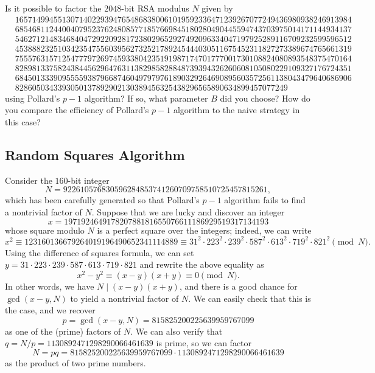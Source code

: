 \begin{exercise}
    Is it possible to factor the $2048$-bit RSA modulus $N$ given by 
    \begin{align*}
        & 1657149945513071402293947654868380061019592336471239267077249436980938246913984 \\
        & 6854681124400407952376248085771857669845180280490445594743703975014171144934137 \\
        & 5462712148346840472922092817238029652927492096334047197925289116709232599596512 \\
        & 4538882325103423547556039562732521789245444030511675452311827273389674765661319 \\ 
        & 7555763157125477797269745933804235191987174701777001730108824080893548375470164 \\ 
        & 8289813375824384456296476311382985828848739394326260608105080229109327176724351 \\ 
        & 6845013339095555938796687460497979761890329264690895603572561138043479640686906 \\ 
        & 8286050343393050137892902130389456325438296565890634899457077249
    \end{align*}
    using Pollard's $p-1$ algorithm? If so, what parameter $B$ did you choose? 
    How do you compare the efficiency of Pollard's $p-1$ algorithm to the 
    naive strategy in this case?
\end{exercise}

\subsection{Random Squares Algorithm}
Consider the $160$-bit integer 
\[ N = 922610576830596284853741260709758510725457815261, \] 
which has been carefully generated so that Pollard's $p-1$ algorithm fails to 
find a nontrivial factor of $N$. Suppose that we are lucky and discover an 
integer 
\[ x = 197192464917820788181655076611186929519317134193 \] 
whose square modulo $N$ is a perfect square over the integers; indeed, we can 
write 
\[ x^2 \equiv 123160136679264019196490652341114889 \equiv 
31^2 \cdot 223^2 \cdot 239^2 \cdot 587^2 \cdot 613^2 \cdot 719^2 \cdot 821^2
\pmod N. \] 
Using the difference of squares formula, we can set 
$y = 31 \cdot 223 \cdot 239 \cdot 587 \cdot 613 \cdot 719 \cdot 821$ 
and rewrite the above equality as 
\[ x^2 - y^2 \equiv (x-y)(x+y) \equiv 0 \pmod N. \] 
In other words, we have $N \mid (x-y)(x+y)$, and there is a good chance 
for $\gcd(x-y, N)$ to yield a nontrivial factor of $N$. We can easily check 
that this is the case, and we recover 
\[ p = \gcd(x-y, N) = 815825200225639959767099 \] 
as one of the (prime) factors of $N$. We can also verify that 
$q = N/p = 1130892471298290066461639$ is prime, so we can factor 
\[ N = pq = 815825200225639959767099 \cdot 1130892471298290066461639 \] 
as the product of two prime numbers. 

